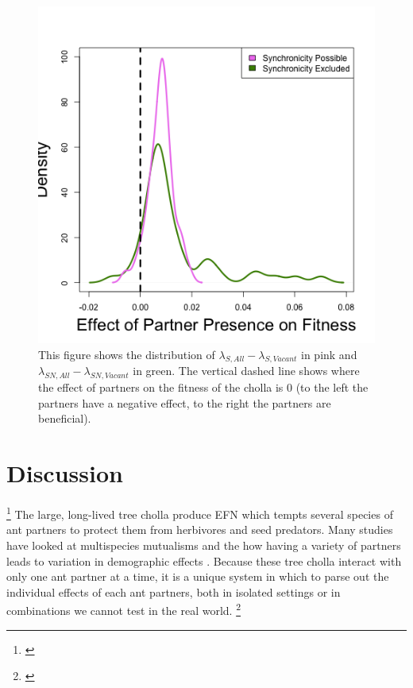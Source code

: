\documentclass[11pt]{article}
\newcommand{\tom}[2]{{\color{red}{#1}}\footnote{\textit{\color{red}{#2}}}}
\begin{document}
\begin{figure}
	\includegraphics[width=\linewidth]{Figures/portfolio_effect.png}
	\caption{This figure shows the distribution of $\lambda_{S,All}-\lambda_{S,Vacant}$ in pink and $\lambda_{SN,All}-\lambda_{SN,Vacant}$ in green. The vertical dashed line shows where the effect of partners on the fitness of the cholla is 0 (to the left the partners have a negative effect, to the right the partners are beneficial).}
	\label{fig:Portfolio}
\end{figure}

\section*{Discussion}
\tom{}{I have not commented too heavily here because I would like to talk through what we want this section to achieve. Currently, most of this section is actually describing results, whereas the pupose is to interpret and contextualize results, and connect them to the broader literature. Some of your content here is actually better at describing results than you had in the Results section, because it includes that element of ``how is this connected to the question'' that was missing from the Results section.}
The large, long-lived tree cholla produce EFN which tempts several species of ant partners to protect them from herbivores and seed predators. 
Many studies have looked at multispecies mutualisms and the how having a variety of partners leads to variation in demographic effects \cite{Palmer2010, Bascompte2019, Stachowicz2005, Ford2015, Baez2016}. 
Because these tree cholla interact with only one ant partner at a time, it is a unique system in which to parse out the individual effects of each ant partners, both in isolated settings or in combinations we cannot test in the real world. \tom{}{This is a good start. In general, I suggest opening the Discussion section with a brief summary of what you were trying to learn in this study, what you found, and its broader significance. This paragraph does a little of that, but I think it can be stronger.}
\end{document}
